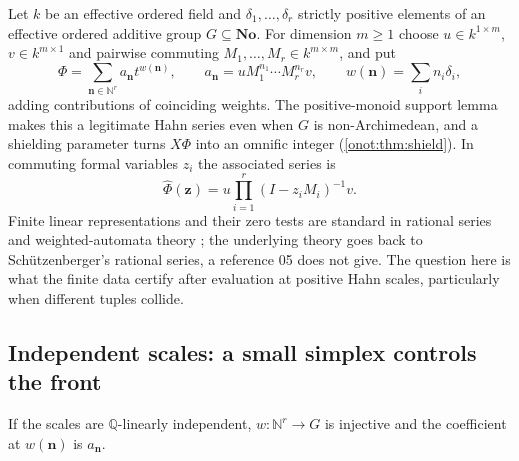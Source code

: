 \documentclass[11pt,oneside]{article}
\numberwithin{equation}{section}
\theoremstyle{definition}
\theoremstyle{remark}
\newcommand{\No}{\mathbf{No}}
\newcommand{\N}{\mathbb N}
\newcommand{\Q}{\mathbb Q}
\begin{document}
Let $k$ be an effective ordered field and $\delta_1,\ldots,\delta_r$ strictly
positive elements of an effective ordered additive group $G\subseteq\No$. For
dimension $m\ge1$ choose $u\in k^{1\times m}$, $v\in k^{m\times1}$ and pairwise
commuting $M_1,\ldots,M_r\in k^{m\times m}$, and put
\begin{equation}\label{onot:sh:eq:matrixseries}
 \Phi=\sum_{\mathbf n\in\N^r}a_{\mathbf n}t^{w(\mathbf n)},\qquad
 a_{\mathbf n}=uM_1^{n_1}\cdots M_r^{n_r}v,\qquad w(\mathbf n)=\sum_in_i\delta_i,
\end{equation}
adding contributions of coinciding weights. The positive-monoid support lemma
makes this a legitimate Hahn series even when $G$ is non-Archimedean, and a
shielding parameter turns $X\Phi$ into an omnific integer (\cref{onot:thm:shield}).
In commuting formal variables $z_i$ the associated series is
\begin{equation}\label{onot:sh:eq:resolvent}
 \widehat\Phi(\mathbf z)=u\prod_{i=1}^r(I-z_iM_i)^{-1}v.
\end{equation}
Finite linear representations and their zero tests are standard in rational
series and weighted-automata theory \cite{Fijalkow,Arvind}; the underlying
theory goes back to Sch\"utzenberger's rational series, a reference 05 does not
give. The question here is what the finite data certify after evaluation at
positive Hahn scales, particularly when different tuples collide.

\subsection{Independent scales: a small simplex controls the front}

If the scales are $\Q$-linearly independent, $w:\N^r\to G$ is injective and the
coefficient at $w(\mathbf n)$ is $a_{\mathbf n}$.
\end{document}
